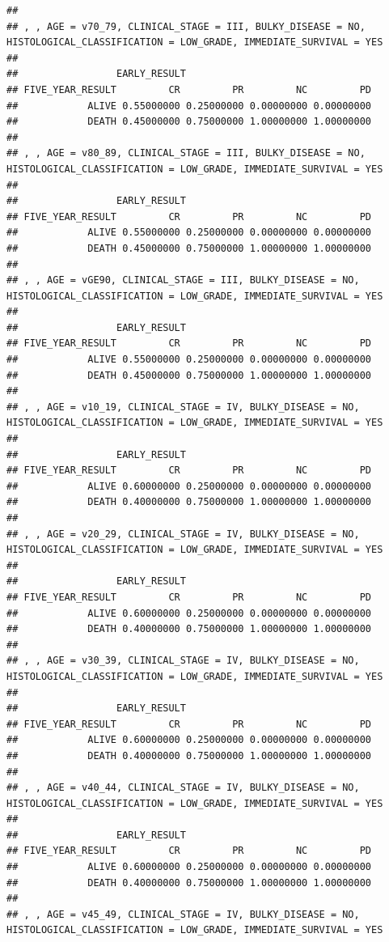 \documentclass[]{article}
\begin{document}
\begin{verbatim}
## 
## , , AGE = v70_79, CLINICAL_STAGE = III, BULKY_DISEASE = NO, HISTOLOGICAL_CLASSIFICATION = LOW_GRADE, IMMEDIATE_SURVIVAL = YES
## 
##                 EARLY_RESULT
## FIVE_YEAR_RESULT         CR         PR         NC         PD
##            ALIVE 0.55000000 0.25000000 0.00000000 0.00000000
##            DEATH 0.45000000 0.75000000 1.00000000 1.00000000
## 
## , , AGE = v80_89, CLINICAL_STAGE = III, BULKY_DISEASE = NO, HISTOLOGICAL_CLASSIFICATION = LOW_GRADE, IMMEDIATE_SURVIVAL = YES
## 
##                 EARLY_RESULT
## FIVE_YEAR_RESULT         CR         PR         NC         PD
##            ALIVE 0.55000000 0.25000000 0.00000000 0.00000000
##            DEATH 0.45000000 0.75000000 1.00000000 1.00000000
## 
## , , AGE = vGE90, CLINICAL_STAGE = III, BULKY_DISEASE = NO, HISTOLOGICAL_CLASSIFICATION = LOW_GRADE, IMMEDIATE_SURVIVAL = YES
## 
##                 EARLY_RESULT
## FIVE_YEAR_RESULT         CR         PR         NC         PD
##            ALIVE 0.55000000 0.25000000 0.00000000 0.00000000
##            DEATH 0.45000000 0.75000000 1.00000000 1.00000000
## 
## , , AGE = v10_19, CLINICAL_STAGE = IV, BULKY_DISEASE = NO, HISTOLOGICAL_CLASSIFICATION = LOW_GRADE, IMMEDIATE_SURVIVAL = YES
## 
##                 EARLY_RESULT
## FIVE_YEAR_RESULT         CR         PR         NC         PD
##            ALIVE 0.60000000 0.25000000 0.00000000 0.00000000
##            DEATH 0.40000000 0.75000000 1.00000000 1.00000000
## 
## , , AGE = v20_29, CLINICAL_STAGE = IV, BULKY_DISEASE = NO, HISTOLOGICAL_CLASSIFICATION = LOW_GRADE, IMMEDIATE_SURVIVAL = YES
## 
##                 EARLY_RESULT
## FIVE_YEAR_RESULT         CR         PR         NC         PD
##            ALIVE 0.60000000 0.25000000 0.00000000 0.00000000
##            DEATH 0.40000000 0.75000000 1.00000000 1.00000000
## 
## , , AGE = v30_39, CLINICAL_STAGE = IV, BULKY_DISEASE = NO, HISTOLOGICAL_CLASSIFICATION = LOW_GRADE, IMMEDIATE_SURVIVAL = YES
## 
##                 EARLY_RESULT
## FIVE_YEAR_RESULT         CR         PR         NC         PD
##            ALIVE 0.60000000 0.25000000 0.00000000 0.00000000
##            DEATH 0.40000000 0.75000000 1.00000000 1.00000000
## 
## , , AGE = v40_44, CLINICAL_STAGE = IV, BULKY_DISEASE = NO, HISTOLOGICAL_CLASSIFICATION = LOW_GRADE, IMMEDIATE_SURVIVAL = YES
## 
##                 EARLY_RESULT
## FIVE_YEAR_RESULT         CR         PR         NC         PD
##            ALIVE 0.60000000 0.25000000 0.00000000 0.00000000
##            DEATH 0.40000000 0.75000000 1.00000000 1.00000000
## 
## , , AGE = v45_49, CLINICAL_STAGE = IV, BULKY_DISEASE = NO, HISTOLOGICAL_CLASSIFICATION = LOW_GRADE, IMMEDIATE_SURVIVAL = YES

\end{verbatim}
\end{document}
